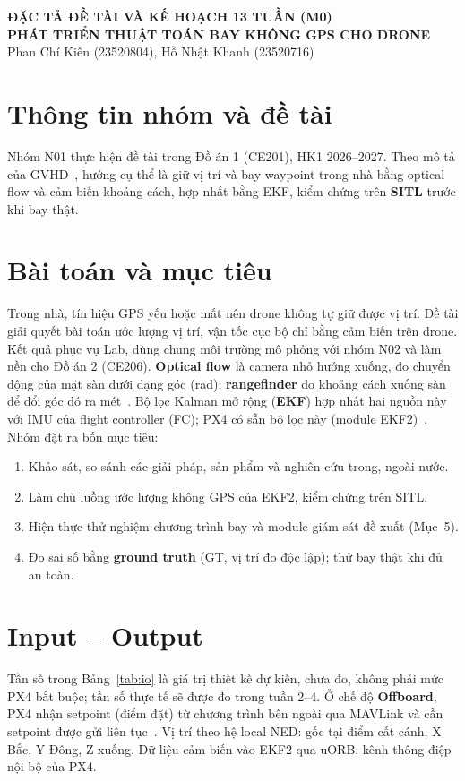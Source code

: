 \documentclass[a4paper,12pt]{article}
\begin{document}
\begin{center}
\textbf{ĐẶC TẢ ĐỀ TÀI VÀ KẾ HOẠCH 13 TUẦN (M0)}\\
\textbf{PHÁT TRIỂN THUẬT TOÁN BAY KHÔNG GPS CHO DRONE}\\
Phan Chí Kiên (23520804), Hồ Nhật Khanh (23520716)\\
\end{center}

\section{Thông tin nhóm và đề tài}
Nhóm N01 thực hiện đề tài trong Đồ án 1 (CE201), HK1 2026--2027. Theo mô tả của GVHD~\cite{assignment}, hướng cụ thể là giữ vị trí và bay waypoint trong nhà bằng optical flow và cảm biến khoảng cách, hợp nhất bằng EKF, kiểm chứng trên \textbf{SITL} trước khi bay thật.

\section{Bài toán và mục tiêu}
Trong nhà, tín hiệu GPS yếu hoặc mất nên drone không tự giữ được vị trí. Đề tài giải quyết bài toán ước lượng vị trí, vận tốc cục bộ chỉ bằng cảm biến trên drone. Kết quả phục vụ Lab, dùng chung môi trường mô phỏng với nhóm N02 và làm nền cho Đồ án 2 (CE206). \textbf{Optical flow} là camera nhỏ hướng xuống, đo chuyển động của mặt sàn dưới dạng góc (rad); \textbf{rangefinder} đo khoảng cách xuống sàn để đổi góc đó ra mét~\cite{flow}. Bộ lọc Kalman mở rộng (\textbf{EKF}) hợp nhất hai nguồn này với IMU của flight controller (FC); PX4 có sẵn bộ lọc này (module EKF2)~\cite{ekf}. Nhóm đặt ra bốn mục tiêu:
\begin{enumerate}
\item Khảo sát, so sánh các giải pháp, sản phẩm và nghiên cứu trong, ngoài nước.
\item Làm chủ luồng ước lượng không GPS của EKF2, kiểm chứng trên SITL.
\item Hiện thực thử nghiệm chương trình bay và module giám sát đề xuất (Mục~5).
\item Đo sai số bằng \textbf{ground truth} (GT, vị trí đo độc lập); thử bay thật khi đủ an toàn.
\end{enumerate}

\section{Input -- Output}
Tần số trong Bảng~\ref{tab:io} là giá trị thiết kế dự kiến, chưa đo, không phải mức PX4 bắt buộc; tần số thực tế sẽ được đo trong tuần 2--4. Ở chế độ \textbf{Offboard}, PX4 nhận setpoint (điểm đặt) từ chương trình bên ngoài qua MAVLink và cần setpoint được gửi liên tục~\cite{offboard}. Vị trí theo hệ local NED: gốc tại điểm cất cánh, X Bắc, Y Đông, Z xuống. Dữ liệu cảm biến vào EKF2 qua uORB, kênh thông điệp nội bộ của PX4.
\end{document}
